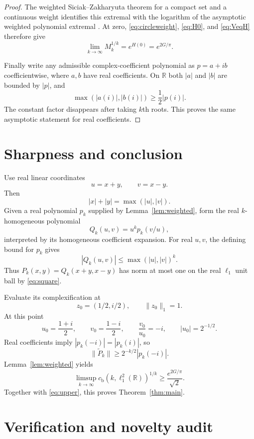 \documentclass[11pt]{article}
\newcommand{\R}{\mathbb R}
\newcommand{\cb}{c_{\mathrm b}}
\begin{document}
\begin{proof}
The weighted Siciak--Zakharyuta theorem for a compact set and a continuous
weight identifies this extremal with the logarithm of the asymptotic
weighted polynomial extremal \cite[Theorem~1.1, standard grading]{MSS}.
At zero, \eqref{eq:circleweight}, \eqref{eq:H0}, and \eqref{eq:VeqH}
therefore give
\[
 \lim_{k\to\infty}M_k^{1/k}=e^{H(0)}=e^{2G/\pi}.
\]

Finally write any admissible complex-coefficient polynomial as $p=a+ib$
coefficientwise, where $a,b$ have real coefficients.  On $\R$ both
$|a|$ and $|b|$ are bounded by $|p|$, and
\[
 \max(|a(i)|,|b(i)|)\ge\frac12|p(i)|.
\]
The constant factor disappears after taking $k$th roots.  This proves the
same asymptotic statement for real coefficients.
\end{proof}

\section{Sharpness and conclusion}

Use real linear coordinates
\[
 u=x+y,\qquad v=x-y.
\]
Then
\begin{equation}\label{eq:square}
 |x|+|y|=\max(|u|,|v|).
\end{equation}
Given a real polynomial $p_k$ supplied by Lemma~\ref{lem:weighted}, form the
real $k$-homogeneous polynomial
\[
 Q_k(u,v)=u^k p_k(v/u),
\]
interpreted by its homogeneous coefficient expansion.  For real $u,v$,
the defining bound for $p_k$ gives
\[
 |Q_k(u,v)|\le\max(|u|,|v|)^k.
\]
Thus $P_k(x,y)=Q_k(x+y,x-y)$ has norm at most one on the real $\ell_1$
unit ball by \eqref{eq:square}.

Evaluate its complexification at
\[
 z_0=(1/2,i/2),\qquad \|z_0\|_1=1.
\]
At this point
\[
 u_0=\frac{1+i}{2},\qquad v_0=\frac{1-i}{2},\qquad
 \frac{v_0}{u_0}=-i,\qquad |u_0|=2^{-1/2}.
\]
Real coefficients imply $|p_k(-i)|=|p_k(i)|$, so
\[
 \|\widetilde P_k\|
 \ge 2^{-k/2}|p_k(-i)|.
\]
Lemma~\ref{lem:weighted} yields
\[
 \limsup_{k\to\infty}\cb(k,\ell_1^2(\R))^{1/k}
 \ge\frac{e^{2G/\pi}}{\sqrt2}.
\]
Together with \eqref{eq:upper}, this proves Theorem~\ref{thm:main}.

\section{Verification and novelty audit}
\end{document}
